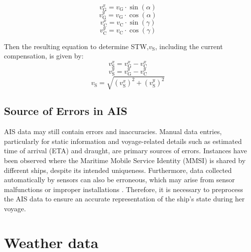 \begin{equation}\label{eqn:sogx}
    v_{\text{G}}^x = v_{\text{G}}\cdot\sin(\alpha)   
\end{equation}
\begin{equation}\label{eqn:sogy}
    v_{\text{G}}^y = v_{\text{G}}\cdot\cos(\alpha)   
\end{equation} 
\begin{equation}\label{eqn:vcurrx}
     v_{\text{C}}^x = v_{\text{C}}\cdot\sin(\gamma)   
\end{equation}
\begin{equation}\label{eqn:vcurry}
    v_{\text{C}}^y = v_{\text{C}}\cdot\cos(\gamma)   
\end{equation}

Then the resulting equation to determine STW,$v_{\text{S}}$, including the current compensation, is given by:\\

\begin{equation}\label{eqn:stwx}
    v_{\text{S}}^x = v_{\text{G}}^x - v_{\text{C}}^x    
\end{equation}
\begin{equation}\label{eqn:stwy}
    v_{\text{S}}^y = v_{\text{G}}^y - v_{\text{C}}^y      
\end{equation}
\begin{equation}\label{eqn:stwabs}
    v_{\text{S}} = \sqrt{(v_{\text{S}}^x)^2 + (v_{\text{S}}^y)^2} 
\end{equation}

\subsection{Source of Errors in AIS}\label{sec:AIS_error}

AIS data may still contain errors and inaccuracies. Manual data entries, particularly for static information and voyage-related details such as estimated time of arrival (ETA) and draught, are primary sources of errors. Instances have been observed where the Maritime Mobile Service Identity (MMSI) is shared by different ships, despite its intended uniqueness. Furthermore, data collected automatically by sensors can also be erroneous, which may arise from sensor malfunctions or improper installations . Therefore, it is necessary to preprocess the AIS data to ensure an accurate representation of the ship's state during her voyage.\\    

\section{Weather data}\label{sec:weather_theo}

